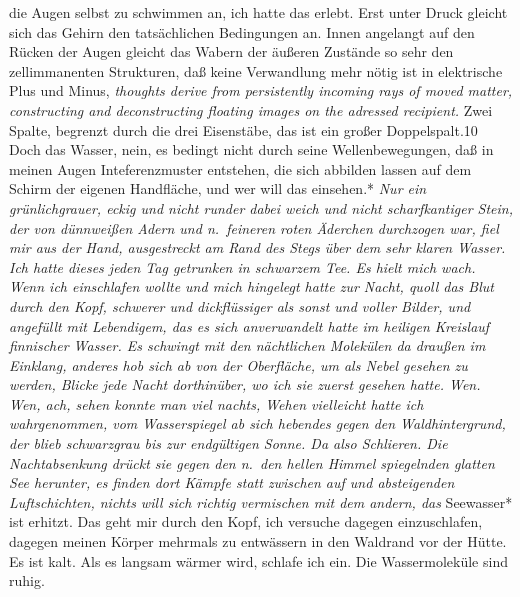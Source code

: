 \documentclass[
]{article}
\begin{document}
die Augen selbst zu schwimmen an, ich hatte das erlebt. Erst unter Druck
gleicht sich das Gehirn den tatsächlichen Bedingungen an. Innen
angelangt auf den Rücken der Augen gleicht das Wabern der äußeren
Zustände so sehr den zellimmanenten Strukturen, daß keine Verwandlung
mehr nötig ist in elektrische Plus und Minus, \emph{thoughts derive from
persistently incoming rays of moved matter, constructing and
deconstructing floating images on the adressed recipient.} Zwei Spalte,
begrenzt durch die drei Eisenstäbe, das ist ein großer Doppelspalt.10
Doch das Wasser, nein, es bedingt nicht durch seine Wellenbewegungen,
daß in meinen Augen Inteferenzmuster entstehen, die sich abbilden lassen
auf dem Schirm der eigenen Handfläche, und wer will das einsehen.*
\emph{Nur ein grünlichgrauer, eckig und nicht runder dabei weich und
nicht scharfkantiger Stein, der von dünnweißen Adern und n.~feineren
roten Äderchen durchzogen war, fiel mir aus der Hand, ausgestreckt am
Rand des Stegs über dem sehr klaren Wasser. Ich hatte dieses jeden Tag
getrunken in schwarzem Tee. Es hielt mich wach. Wenn ich einschlafen
wollte und mich hingelegt hatte zur Nacht, quoll das Blut durch den
Kopf, schwerer und dickflüssiger als sonst und voller Bilder, und
angefüllt mit Lebendigem, das es sich anverwandelt hatte im heiligen
Kreislauf finnischer Wasser. Es schwingt mit den nächtlichen Molekülen
da draußen im Einklang, anderes hob sich ab von der Oberfläche, um als
Nebel gesehen zu werden, Blicke jede Nacht dorthinüber, wo ich sie
zuerst gesehen hatte. Wen. Wen, ach, sehen konnte man viel nachts, Wehen
vielleicht hatte ich wahrgenommen, vom Wasserspiegel ab sich hebendes
gegen den Waldhintergrund, der blieb schwarzgrau bis zur endgültigen
Sonne. Da also Schlieren. Die Nachtabsenkung drückt sie gegen den n.~den
hellen Himmel spiegelnden glatten See herunter, es finden dort Kämpfe
statt zwischen auf und absteigenden Luftschichten, nichts will sich
richtig vermischen mit dem andern, das }Seewasser* ist erhitzt. Das geht
mir durch den Kopf, ich versuche dagegen einzuschlafen, dagegen meinen
Körper mehrmals zu entwässern in den Waldrand vor der Hütte. Es ist
kalt. Als es langsam wärmer wird, schlafe ich ein. Die Wassermoleküle
sind ruhig.
\end{document}
